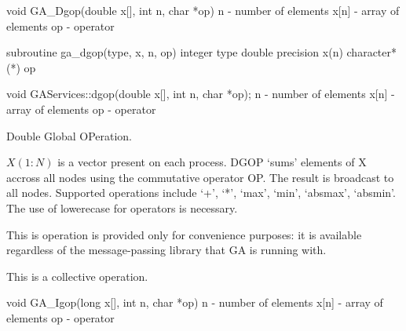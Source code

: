 \documentclass[12pt]{article}
\begin{document}

\begin{capi}
void GA_Dgop(double x[], int n, char *op)
   n     - number of elements                                              \access{[input]} 
   x[n]  - array of elements                                                
   op    - operator                                                        \access{[input]} 
\end{capi}

\begin{fapi}
subroutine ga_dgop(type, x, n, op)
   integer type                                                            \access{[input]} 
   double precision x(n)                                                    
   character*(*) op                                                        \access{[input]} 
\end{fapi}

\begin{cxxapi}
void GAServices::dgop(double x[], int n, char *op);
   n                 - number of elements                                  \access{[input]}
   x[n]              - array of elements                                   
   op                - operator                                            \access{[input]}
\end{cxxapi}

\begin{desc}

Double Global OPeration.

$X(1:N)$ is a vector present on each process. DGOP `sums' elements of X accross all nodes using the commutative operator OP. The result is broadcast to all nodes. Supported operations include `+', `*', `max', `min', `absmax', `absmin'. The use of lowerecase for operators is necessary.

This is operation is provided only for convenience purposes: it is available regardless of the message-passing library that GA is running with.

This is a collective operation.
\end{desc}


\begin{capi}
void GA_Igop(long x[], int n, char *op)
   n     - number of elements                                              \access{[input]} 
   x[n]  - array of elements                                                
   op    - operator                                                        \access{[input]} 
\end{capi}
\end{document}
